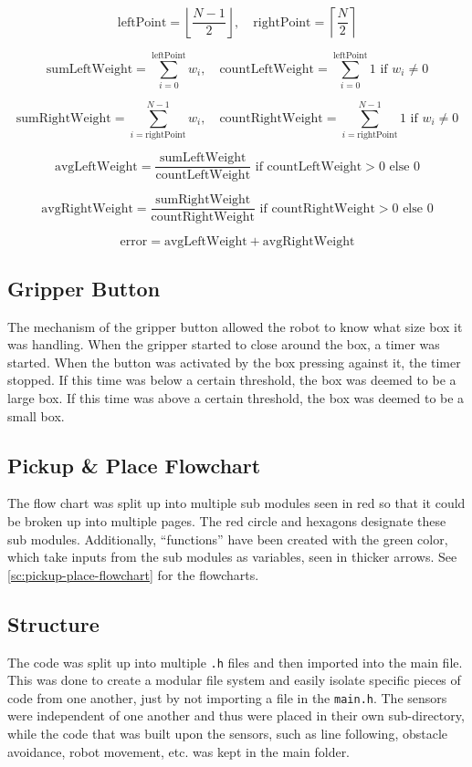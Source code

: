 \documentclass[11pt]{report}
\begin{document}
\[
\text{leftPoint} = \left\lfloor \frac{N-1}{2} \right\rfloor, \quad \text{rightPoint} = \left\lceil \frac{N}{2} \right\rceil
\]

\[
\text{sumLeftWeight} = \sum_{i=0}^{\text{leftPoint}} w_i, \quad \text{countLeftWeight} = \sum_{i=0}^{\text{leftPoint}} 1 \text{ if } w_i \neq 0
\]

\[
\text{sumRightWeight} = \sum_{i=\text{rightPoint}}^{N-1} w_i, \quad \text{countRightWeight} = \sum_{i=\text{rightPoint}}^{N-1} 1 \text{ if } w_i \neq 0
\]

\[
\text{avgLeftWeight} = \frac{\text{sumLeftWeight}}{\text{countLeftWeight}} \text{ if } \text{countLeftWeight} > 0 \text{ else } 0
\]

\[
\text{avgRightWeight} = \frac{\text{sumRightWeight}}{\text{countRightWeight}} \text{ if } \text{countRightWeight} > 0 \text{ else } 0
\]

\[
\text{error} = \text{avgLeftWeight} + \text{avgRightWeight}
\]

\subsection{Gripper Button}
The mechanism of the gripper button allowed the robot to know what size box it was handling. When the gripper started to close around the box, a timer was started. When the button was activated by the box pressing against it, the timer stopped. If this time was below a certain threshold, the box was deemed to be a large box. If this time was above a certain threshold, the box was deemed to be a small box. 

\subsection{Pickup \& Place Flowchart}

The flow chart was split up into multiple sub modules seen in red so that it could be broken up into multiple pages. The red circle and hexagons designate these sub modules. Additionally, ``functions'' have been created with the green color, which take inputs from the sub modules as variables, seen in thicker arrows. See \cref{sc:pickup-place-flowchart} for the flowcharts.

\subsection{Structure}

The code was split up into multiple \texttt{.h} files and then imported into the main file. This was done to create a modular file system and easily isolate specific pieces of code from one another, just by not importing a file in the \texttt{main.h}. The sensors were independent of one another and thus were placed in their own sub-directory, while the code that was built upon the sensors, such as line following, obstacle avoidance, robot movement, etc. was kept in the main folder.
\end{document}
